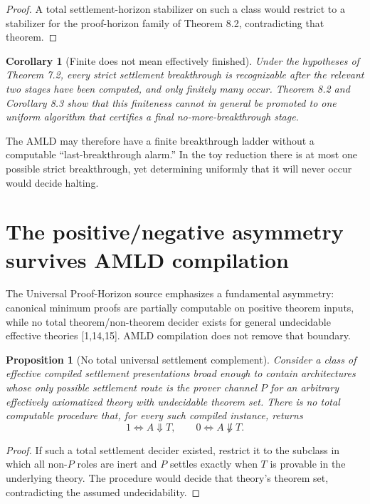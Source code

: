 \documentclass[11pt]{article}
\newtheorem{proposition}[theorem]{Proposition}
\newtheorem{corollary}[theorem]{Corollary}
\theoremstyle{definition}
\begin{document}
\begin{proof}
A total settlement-horizon stabilizer on such a class would restrict to a stabilizer for the proof-horizon family of Theorem 8.2, contradicting that theorem.
\end{proof}

\begin{corollary}[Finite does not mean effectively finished]
Under the hypotheses of Theorem 7.2, every strict settlement breakthrough is recognizable after the relevant two stages have been computed, and only finitely many occur. Theorem 8.2 and Corollary 8.3 show that this finiteness cannot in general be promoted to one uniform algorithm that certifies a final no-more-breakthrough stage.
\end{corollary}

The AMLD may therefore have a finite breakthrough ladder without a computable ``last-breakthrough alarm.'' In the toy reduction there is at most one possible strict breakthrough, yet determining uniformly that it will never occur would decide halting.

\section{The positive/negative asymmetry survives AMLD compilation}
The Universal Proof-Horizon source emphasizes a fundamental asymmetry: canonical minimum proofs are partially computable on positive theorem inputs, while no total theorem/non-theorem decider exists for general undecidable effective theories [1,14,15]. AMLD compilation does not remove that boundary.

\begin{proposition}[No total universal settlement complement]
Consider a class of effective compiled settlement presentations broad enough to contain architectures whose only possible settlement route is the prover channel $P$ for an arbitrary effectively axiomatized theory with undecidable theorem set. There is no total computable procedure that, for every such compiled instance, returns
\[
1\iff A\Downarrow T,
\qquad
0\iff A\not\Downarrow T.
\]
\end{proposition}

\begin{proof}
If such a total settlement decider existed, restrict it to the subclass in which all non-$P$ roles are inert and $P$ settles exactly when $T$ is provable in the underlying theory. The procedure would decide that theory's theorem set, contradicting the assumed undecidability.
\end{proof}
\end{document}
